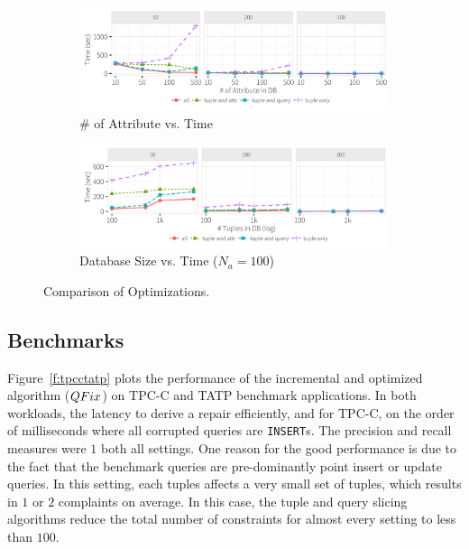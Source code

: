  \begin{figure}[h]
    \vspace*{-.1in}
    \centering
    \begin{subfigure}[t]{.45\textwidth}
    \includegraphics[width = .99\columnwidth]{figures/attr_time}
    \vspace*{-.1in}
    \caption{\# of Attribute vs. Time}
    \label{f:attr} 
    \end{subfigure}
    \begin{subfigure}[t]{.45\textwidth}
    \includegraphics[width = .99\columnwidth]{figures/attr100_time}
    \vspace*{-.1in}
    \caption{Database Size vs. Time ($N_a = 100$)}
    \label{f:attr100} 
    \end{subfigure}
    \vspace*{-.1in}
    \caption{Comparison of Optimizations.}
  \end{figure}
  
\subsection{Benchmarks }
\label{sec:experiments:benchmark}

Figure~\ref{f:tpcctatp} plots the performance of the incremental and  optimized algorithm ($QFix$)
on TPC-C and TATP benchmark applications.  In both workloads, the latency to derive a repair efficiently,
and for TPC-C, on the order of milliseconds where all corrupted queries are \texttt{INSERT}s. 
The precision and recall measures were
$1$ both all settings.   One reason for the good performance is due to the fact that the benchmark queries
are pre-dominantly point insert or update queries.  In this setting, each tuples affects a very small set of 
tuples, which results in $1$ or $2$ complaints on average.  In this case, the tuple and query slicing algorithms
reduce the total number of constraints for almost every setting to less than $100$.


